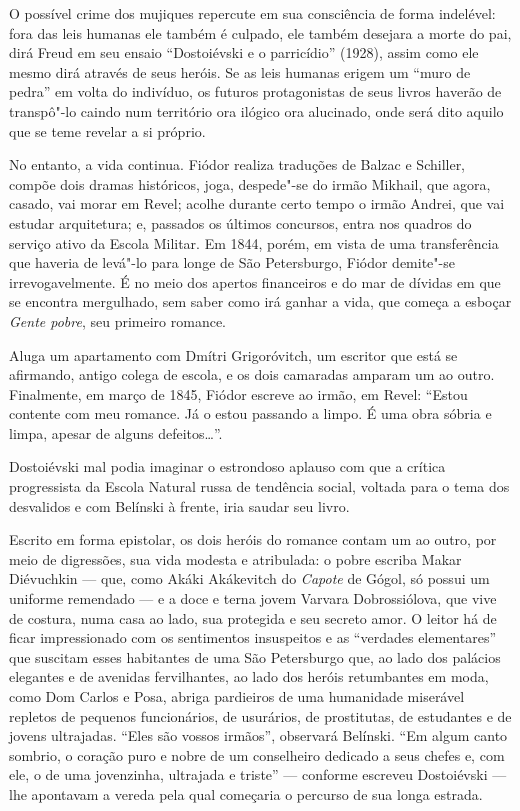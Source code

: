 O possível crime dos mujiques repercute em sua consciência de
forma indelével: fora das leis humanas ele também é culpado, ele
também desejara a morte do pai, dirá Freud em seu ensaio
``Dostoiévski e o parricídio'' (1928), assim como ele mesmo
dirá através de seus heróis. Se as leis humanas erigem um
``muro de pedra'' em volta do indivíduo, os futuros protagonistas
de seus livros haverão de transpô"-lo caindo num território ora
ilógico ora alucinado, onde será dito aquilo que se teme revelar
a si próprio.

No entanto, a vida continua. Fiódor realiza traduções de Balzac
e Schiller, compõe dois dramas históricos, joga, despede"-se do
irmão Mikhail, que agora, casado, vai morar em Revel; acolhe
durante certo tempo o irmão Andrei, que vai estudar arquitetura;
e, passados os últimos concursos, entra nos quadros do serviço
ativo da Escola Militar. Em 1844, porém, em vista de uma
transferência que haveria de levá"-lo para longe de São
Petersburgo, Fiódor demite"-se irrevogavelmente. É no meio dos apertos
financeiros e do mar de dívidas em que se encontra mergulhado, sem saber
como irá ganhar a vida, que começa a esboçar \emph{Gente
pobre}, seu primeiro romance.

Aluga um apartamento com Dmítri Grigoróvitch, um escritor que
está se afirmando, antigo colega de escola, e os dois camaradas
amparam um ao outro. Finalmente, em março de 1845, Fiódor escreve ao irmão, em
Revel: ``Estou contente com meu romance. Já o estou passando a limpo.
É uma obra sóbria e limpa, apesar de alguns defeitos\ldots{}''.

Dostoiévski mal podia imaginar o estrondoso aplauso com que a
crítica progressista da Escola Natural russa de tendência
social, voltada para o tema dos desvalidos e com Belínski à
frente, iria saudar seu livro.

Escrito em forma epistolar, os dois heróis do romance contam um
ao outro, por meio de digressões, sua vida modesta e atribulada:
o pobre escriba Makar Diévuchkin --- que, como Akáki Akákevitch do
\emph{Capote} de Gógol, só possui um uniforme remendado --- e a
doce e terna jovem Varvara Dobrossiólova, que vive de costura,
numa casa ao lado, sua protegida e seu secreto amor. O
leitor há de ficar impressionado com os sentimentos insuspeitos
e as ``verdades elementares'' que suscitam esses habitantes de
uma São Petersburgo que, ao lado dos palácios elegantes e de
avenidas fervilhantes, ao lado dos heróis retumbantes em moda,
como Dom Carlos e Posa, abriga pardieiros de uma humanidade
miserável repletos de pequenos funcionários, de usurários, de
prostitutas, de estudantes e de jovens ultrajadas. ``Eles são
vossos irmãos'', observará Belínski. ``Em algum canto sombrio,
o coração puro e nobre de um conselheiro dedicado a seus chefes
e, com ele, o de uma jovenzinha, ultrajada e triste'' ---
conforme escreveu Dostoiévski --- lhe apontavam a vereda pela
qual começaria o percurso de sua longa estrada.



